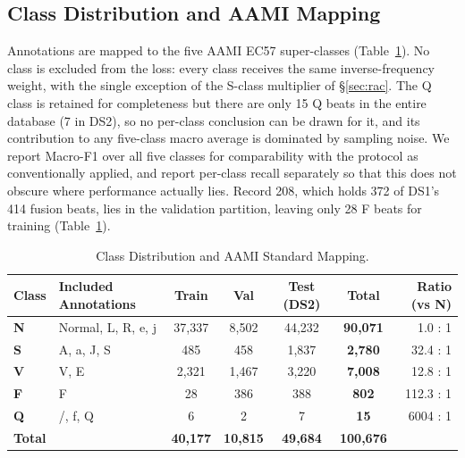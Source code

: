 \documentclass[journal,twoside,web]{ieeecolor}
\begin{document}
\subsection{Class Distribution and AAMI Mapping}
Annotations are mapped to the five AAMI EC57 super-classes \cite{xiao_deep_2023, luz_survey_2016} (Table~\ref{tab:class_dist}). No class is excluded from the loss: every class receives the same inverse-frequency weight, with the single exception of the S-class multiplier of \S\ref{sec:rac}. The Q class is retained for completeness but there are only 15 Q beats in the entire database (7 in DS2), so no per-class conclusion can be drawn for it, and its contribution to any five-class macro average is dominated by sampling noise. We report Macro-F1 over all five classes for comparability with the protocol as conventionally applied, and report per-class recall separately so that this does not obscure where performance actually lies. Record 208, which holds 372 of DS1's 414 fusion beats, lies in the validation partition, leaving only 28 F beats for training (Table~\ref{tab:class_dist}).

\begin{table}[!t]
\caption{Class Distribution and AAMI Standard Mapping.}
\label{tab:class_dist}
\centering
\footnotesize
\begin{tabular}{@{}llccccr@{}}
\toprule
\textbf{Class} & \textbf{Included Annotations} & \textbf{Train} & \textbf{Val} & \textbf{Test (DS2)} & \textbf{Total} & \textbf{Ratio (vs N)} \\ \midrule
\textbf{N} & Normal, L, R, e, j & 37,337 & 8,502 & 44,232 & \textbf{90,071} & 1.0 : 1 \\
\textbf{S} & A, a, J, S & 485 & 458 & 1,837 & \textbf{2,780} & 32.4 : 1 \\
\textbf{V} & V, E & 2,321 & 1,467 & 3,220 & \textbf{7,008} & 12.8 : 1 \\
\textbf{F} & F & 28 & 386 & 388 & \textbf{802} & 112.3 : 1 \\
\textbf{Q} & /, f, Q & 6 & 2 & 7 & \textbf{15} & 6004 : 1 \\ \midrule
\textbf{Total} & & \textbf{40,177} & \textbf{10,815} & \textbf{49,684} & \textbf{100,676} & \\ \bottomrule
\end{tabular}
\end{table}
\end{document}

